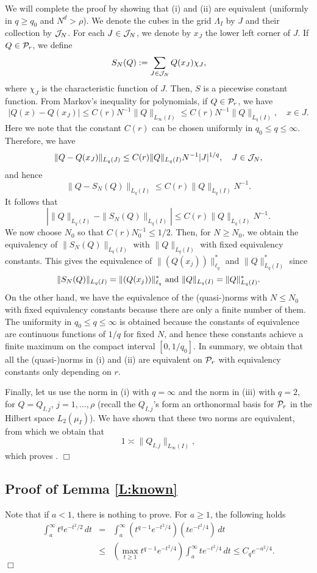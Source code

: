 We will complete the proof by showing that (i) and (ii) are equivalent (uniformly in $q \geq q_0$ and $N^d > \rho$).   We denote  the cubes in the grid $\Lambda_I$ by $J$ and their collection by ${\cal J}_N$.
     For each $J\in{\cal J}_N$, we denote by  $x_J$    the lower left corner of $J$.  If  $Q\in{\cal P}_r$, we define
$$
S_N(Q):=\sum_{J\in{\cal J}_N}Q(x_J)\chi_J,
$$ 
where $\chi_J$ is the characteristic function of $J$.
Then, $S$ is a piecewise constant function. From Markov's inequality  for polynomials, if $Q\in{\cal P}_r$, we have
$$
|Q(x)-Q(x_J)|\le C(r) N^{-1}\|Q\|_{L_\infty(I)} \le C(r)N^{-1}\|Q\|_{L_q(I)},\quad x\in J.
$$ 
Here we note that the constant $C(r)$ can be chosen uniformly in $q_0 \leq q \leq \infty$. Therefore, we have
$$ 
\|Q-Q(x_J)\|_{L_q(J)}\le C(r) \|Q\|_{L_q(I)} N^{-1}|J|^{1/q}, \quad J\in{\cal J}_N,
$$
and hence
$$
\|Q-S_N(Q)\|_{L_q(I)} \le C(r)\|Q\|_{L_q(I)}N^{-1}.
$$
It follows that
$$ 
|\|Q\|_{L_q(I)} -\|S_N(Q)\|_{L_q(I)}|\le C(r)\|Q\|_{L_q(I)}N^{-1}.
$$
We now choose $N_0$ so that $C(r)N_0^{-1}\le 1/2$. 
Then, for $N\ge N_0$, we obtain the equivalency of $\|S_N(Q)\|_{L_q(I)}$ with $\|Q\|_{L_q(I)}$ with fixed equivalency constants.  This gives the equivalence of $\|(Q(x_j))\|^*_{\ell_q}$ and $ \|Q\|^*_{L_q(I)}$ since 
$$
\|S_N(Q)\|_{L_q(I)}=\|(Q(x_j))\|^*_{\ell_q} {\rm ~and~} \|Q\|_{L_q(I)}=\|Q\|^*_{L_q(I)}.
$$
On the other hand, we have the equivalence of the (quasi-)norms with $N\le N_0$ with fixed equivalency constants because there are only a finite number of them. The uniformity in $q_0 \leq q \leq \infty$ is obtained because the constants of equivalence are continuous functions of $1/q$ for fixed $N$, and hence these constants achieve a finite maximum on the compact interval $[0,1/q_0]$. In summary, we obtain that all the (quasi-)norms in (i) and (ii) are equivalent on ${\cal P}_r$ with equivalency constants only depending on $r$.

Finally, let us use the norm in  (i) with $q=\infty$  and the norm in (iii) with  $q=2$, for  $Q=Q_{I,j}$, $j=1, \ldots,\rho$ (recall the $Q_{I,j}$'s  form an orthonormal basis for ${\cal P}_r$ in the Hilbert space $L_2(\mu_I)$). We have shown that these two norms are equivalent, from which we obtain that  
 $$
 1\asymp \|Q_{I,j}\|_{L_\infty(I)},
 $$
 which proves .
 \hfill $\Box$

 




  

\subsection {Proof of Lemma \ref{L:known}}
\label{LemmaK}
Note that if $a < 1$, there is nothing to prove. For $a \geq 1$, the following holds
\begin{eqnarray}
\nonumber
\int_a^\infty t^qe^{-t^2/2}\,dt&=&
\int_a^\infty (t^{q-1}e^{-t^2/4})(te^{-t^2/4})\,dt\nonumber\\
&\leq&
\left(\max_{t \geq 1} t^{q-1}e^{-t^2/4}\right)\int_a^\infty te^{-t^2/4}\,dt
\leq
C_qe^{-a^2/4}.
 \nonumber 
\end{eqnarray}
\hfill $\Box$

